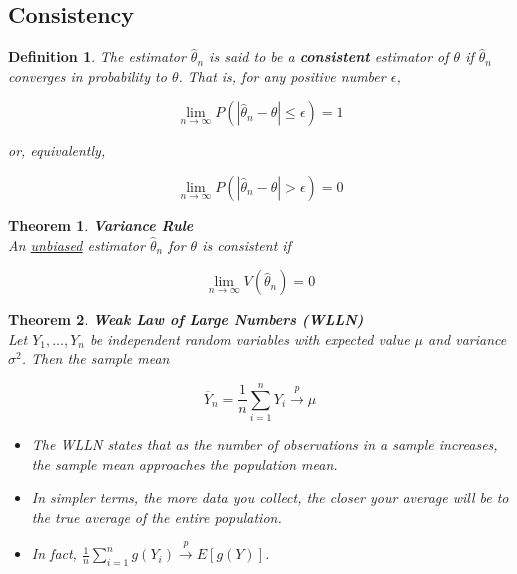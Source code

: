 \documentclass[a4paper,12pt]{article}
\theoremstyle{nonitalic}
\newtheorem{definition}{Definition}[subsection]
\newtheorem{theorem}{Theorem}[subsection]
\begin{document}
    \newpage

    \subsection{Consistency}

    \begin{definition}
        The estimator $\hat{\theta}_n$ is said to be a \textbf{consistent} estimator of $\theta$ if $\hat{\theta}_n$ converges in probability to $\theta$. That is, for any positive number $\epsilon$,
        
        \[
            \lim_{n \to \infty} P\left( |\hat{\theta}_n - \theta| \leq \epsilon \right) = 1
        \]
        
        or, equivalently,
        
        \[
            \lim_{n \to \infty} P\left( |\hat{\theta}_n - \theta| > \epsilon \right) = 0
        \]
    \end{definition}
        
    \begin{theorem} \textbf{Variance Rule}\\
        An \underline{unbiased} estimator $\hat{\theta}_n$ for $\theta$ is consistent if
        
        \[
            \lim_{n \to \infty} V\left( \hat{\theta}_n \right) = 0
        \]
    \end{theorem}

    \begin{theorem} \textbf{Weak Law of Large Numbers (WLLN)}\\
        Let $Y_1, \ldots, Y_n$ be independent random variables with expected value $\mu$ and variance $\sigma^2$. Then the sample mean
        
        \[
            \overline{Y}_n = \frac{1}{n} \sum_{i=1}^{n} Y_i \xrightarrow{p} \mu
        \]
        
        \begin{itemize}
            \item The WLLN states that as the number of observations in a sample increases, the sample mean approaches the population mean.
            \item In simpler terms, the more data you collect, the closer your average will be to the true average of the entire population.
            \item In fact, \(\frac{1}{n} \sum\limits_{i=1}^{n} g(Y_i) \xrightarrow{p} E[g(Y)]\).
        \end{itemize}
        
    \end{theorem}
\end{document}
